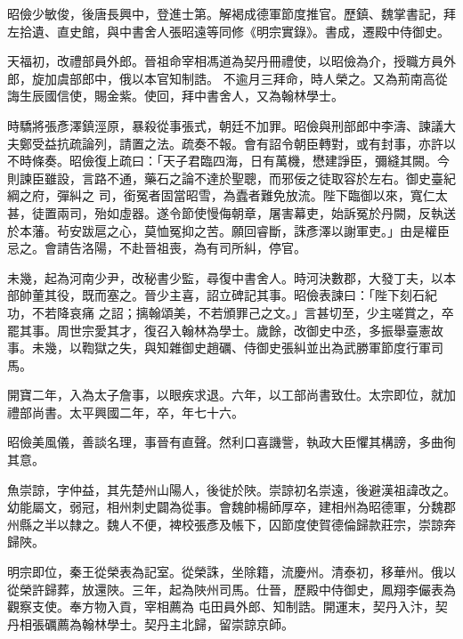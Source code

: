 \begin{pinyinscope}
 昭儉少敏俊，後唐長興中，登進士第。解褐成德軍節度推官。歷鎮、魏掌書記，拜左拾遺、直史館，與中書舍人張昭遠等同修《明宗實錄》。書成，遷殿中侍御史。



 天福初，改禮部員外郎。晉祖命宰相馮道為契丹冊禮使，以昭儉為介，授職方員外郎，旋加虞部郎中，俄以本官知制誥。
 不逾月三拜命，時人榮之。又為荊南高從誨生辰國信使，賜金紫。使回，拜中書舍人，又為翰林學士。



 時驕將張彥澤鎮涇原，暴殺從事張式，朝廷不加罪。昭儉與刑部郎中李濤、諫議大夫鄭受益抗疏論列，請置之法。疏奏不報。會有詔令朝臣轉對，或有封事，亦許以不時條奏。昭儉復上疏曰：「天子君臨四海，日有萬機，懋建諍臣，彌縫其闕。今則諫臣雖設，言路不通，藥石之論不達於聖聰，而邪佞之徒取容於左右。御史臺紀綱之府，彈糾之
 司，銜冤者固當昭雪，為蠹者難免放流。陛下臨御以來，寬仁太甚，徒置兩司，殆如虛器。遂令節使慢侮朝章，屠害幕吏，始訴冤於丹闕，反執送於本藩。茍安跋扈之心，莫恤冤抑之苦。願回睿斷，誅彥澤以謝軍吏。」由是權臣忌之。會請告洛陽，不赴晉祖喪，為有司所糾，停官。



 未幾，起為河南少尹，改秘書少監，尋復中書舍人。時河決數郡，大發丁夫，以本部帥董其役，既而塞之。晉少主喜，詔立碑記其事。昭儉表諫曰：「陛下刻石紀功，不若降哀痛
 之詔；摛翰頌美，不若頒罪己之文。」言甚切至，少主嗟賞之，卒罷其事。周世宗愛其才，復召入翰林為學士。歲餘，改御史中丞，多振舉臺憲故事。未幾，以鞫獄之失，與知雜御史趙礪、侍御史張糾並出為武勝軍節度行軍司馬。



 開寶二年，入為太子詹事，以眼疾求退。六年，以工部尚書致仕。太宗即位，就加禮部尚書。太平興國二年，卒，年七十六。



 昭儉美風儀，善談名理，事晉有直聲。然利口喜譏訾，執政大臣懼其構謗，多曲徇其意。



 魚崇諒，字仲益，其先楚州山陽人，後徙於陜。崇諒初名崇遠，後避漢祖諱改之。幼能屬文，弱冠，相州刺史闢為從事。會魏帥楊師厚卒，建相州為昭德軍，分魏郡州縣之半以隸之。魏人不便，裨校張彥及帳下，囚節度使賀德倫歸款莊宗，崇諒奔歸陜。



 明宗即位，秦王從榮表為記室。從榮誅，坐除籍，流慶州。清泰初，移華州。俄以從榮許歸葬，放還陜。三年，起為陜州司馬。仕晉，歷殿中侍御史，鳳翔李儼表為觀察支使。奉方物入貢，宰相薦為
 屯田員外郎、知制誥。開運末，契丹入汴，契丹相張礪薦為翰林學士。契丹主北歸，留崇諒京師。




\end{pinyinscope}
